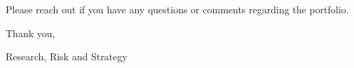\documentclass[11pt,pressrelease]{newlfm} %
\begin{document}
\begin{newlfm}
\begin{singlespace}
\begin{enumerate}
\end{enumerate}
Please reach out if you have any questions or comments regarding the portfolio. 

Thank you, \par

Research, Risk and Strategy


\end{singlespace} %



\end{newlfm}
\end{document}
